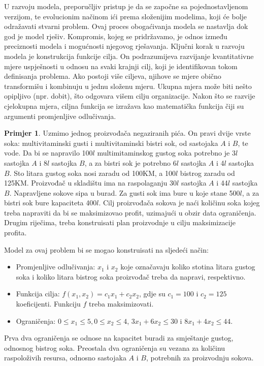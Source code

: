\documentclass[a4paper, utf8, 11pt, colorlinks]{book}
\theoremstyle{definition}
\newtheorem{primjer}{Primjer}[chapter]
\begin{document}
 U razvoju modela, preporučljiv pristup je da se započne sa pojednostavljenom verzijom, te  evolucionim načinom ići prema složenijim modelima, koji će bolje odražavati  stvarni problem. Ovaj proces obogaćivanja modela se nastavlja dok god je model rješiv. Kompromis, kojeg se pridržavamo, je odnos između preciznosti modela i mogućnosti njegovog rješavanja. Ključni korak u razvoju modela je konstrukcija funkcije cilja.
On podrazumijeva razvijanje kvantitativne mjere uspješnosti u odnosu na svaki krajnji cilj, koji je identifikovan tokom definisanja problema.
Ako postoji više ciljeva, njihove se mjere obično transformišu
i kombinuju u jednu složenu mjeru.  Ukupna mjera može biti nešto opipljivo (npr. dobit), što odgovara višem cilju
organizacije.  Nakon što se razvije cjelokupna mjera,  ciljna funkcija se izražava kao matematička funkcija čiji su argumenti promjenljive odlučivanja. 

\begin{primjer}
Uzmimo jednog proizvođača negaziranih pića. On pravi dvije vrste soka: multivitaminski gusti i multivitaminski bistri sok, od sastojaka $A$ i $B$, te vode. Da bi se napravilo 100$l$ multimitaminskog gustog soka potrebno je 3$l$
sastojka $A$ i 8$l$ sastojka $B$, a za bistri sok je potrebno 6$l$ sastojka $A$ i 4$l$ sastojka $B$. Sto litara gustog soka nosi zaradu od 100KM, a 100$l$ bistrog zaradu od 125KM. Proizvođač u skladištu
ima na raspolaganju 30$l$ sastojka $A$ i 44$l$ sastojka $B.$ Napravljene sokove sipa u burad. Za
gusti sok ima bure u koje stane 500$l$, a za bistri sok bure kapaciteta 400$l$.  Cilj proizvođača sokova je naći količinu soka kojeg treba napraviti da bi se  maksimizovao profit,  uzimajući u obzir data ograničenja. Drugim
riječima, treba konstruisati plan proizvodnje u cilju maksimizacije profita.
	
\end{primjer}
Model za ovaj problem bi se mogao konstruisati na sljedeći način:
\begin{itemize}
    \item 
Promjenljive odlučivanja: $x_1$ i $x_2$ koje označavaju koliko stotina litara gustog soka i koliko litara bistrog soka proizvođač treba da napravi, respektivno.  
\item Funkcija cilja: $f(x_1, x_2) = c_1x_1 + c_2 x_2$, gdje su $c_1 = 100$ i  $c_2 = 125$ koeficijenti. Funkciju $f$ treba maksimizovati. 
\item Ograničenja: $0 \leq x_1 \leq 5, 0 \leq x_2 \leq 4$,   $3 x_1 + 6 x_2 \leq 30$ i $8 x_1 + 4 x_2 \leq 44.$
\end{itemize}
Prva dva ograničenja se odnose na kapacitet buradi za smještanje gustog, odnosnog bistrog soka. Preostala dva ograničenja su vezana za količinu raspoloživih resursa, odnosno sastojaka $A$ i $B$, potrebnih za proizvodnju sokova.
\end{document}
